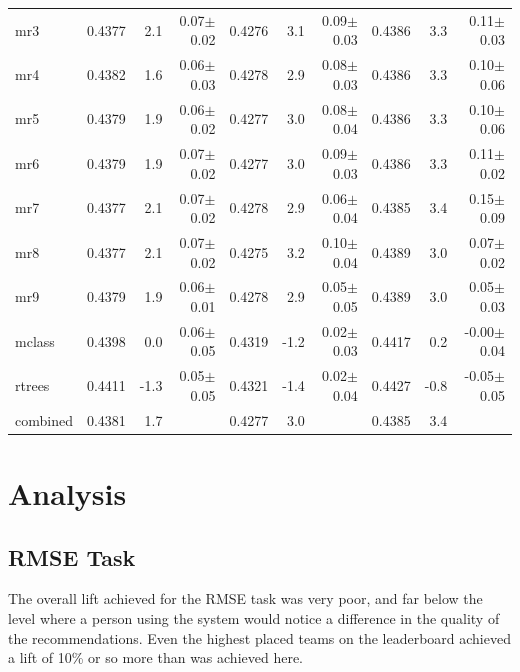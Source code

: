 \documentclass{article}
\begin{document}
\begin{table}[b]
\begin{center}
\begin{small}
\begin{sc}
\begin{tabular}{l|rr r|rr r|rr r}
mr3        & 0.4377 &   2.1 &  0.07$\pm$0.02& 0.4276 &   3.1 &  0.09$\pm$0.03& 0.4386 &   3.3 &  0.11$\pm$0.03 \\ 
mr4        & 0.4382 &   1.6 &  0.06$\pm$0.03& 0.4278 &   2.9 &  0.08$\pm$0.03& 0.4386 &   3.3 &  0.10$\pm$0.06 \\ 
mr5        & 0.4379 &   1.9 &  0.06$\pm$0.02& 0.4277 &   3.0 &  0.08$\pm$0.04& 0.4386 &   3.3 &  0.10$\pm$0.06 \\ 
mr6        & 0.4379 &   1.9 &  0.07$\pm$0.02& 0.4277 &   3.0 &  0.09$\pm$0.03& 0.4386 &   3.3 &  0.11$\pm$0.02 \\ 
mr7        & 0.4377 &   2.1 &  0.07$\pm$0.02& 0.4278 &   2.9 &  0.06$\pm$0.04& 0.4385 &   3.4 &  0.15$\pm$0.09 \\ 
mr8        & 0.4377 &   2.1 &  0.07$\pm$0.02& 0.4275 &   3.2 &  0.10$\pm$0.04& 0.4389 &   3.0 &  0.07$\pm$0.02 \\ 
mr9        & 0.4379 &   1.9 &  0.06$\pm$0.01& 0.4278 &   2.9 &  0.05$\pm$0.05& 0.4389 &   3.0 &  0.05$\pm$0.03 \\ 
\abovespace
mclass     & 0.4398 &   0.0 &  0.06$\pm$0.05& 0.4319 &  -1.2 &  0.02$\pm$0.03& 0.4417 &   0.2 & -0.00$\pm$0.04 \\ 
rtrees     & 0.4411 &  -1.3 &  0.05$\pm$0.05& 0.4321 &  -1.4 &  0.02$\pm$0.04& 0.4427 &  -0.8 & -0.05$\pm$0.05 \\ 
\abovespace\belowspace
combined   & 0.4381 &   1.7 &  & 0.4277 &   3.0 &  & 0.4385 &   3.4 &   \\ 
\hline
\end{tabular}
\end{sc}
\end{small}
\end{center}
\vskip -0.1in
\end{table}

\section{Analysis}

\subsection{RMSE Task}

The overall lift achieved for the RMSE task was very poor, and far below the level where a person using the system would notice a difference in the quality of the recommendations.  Even the highest placed teams on the leaderboard achieved a lift of 10\% or so more than was achieved here.
\end{document}
